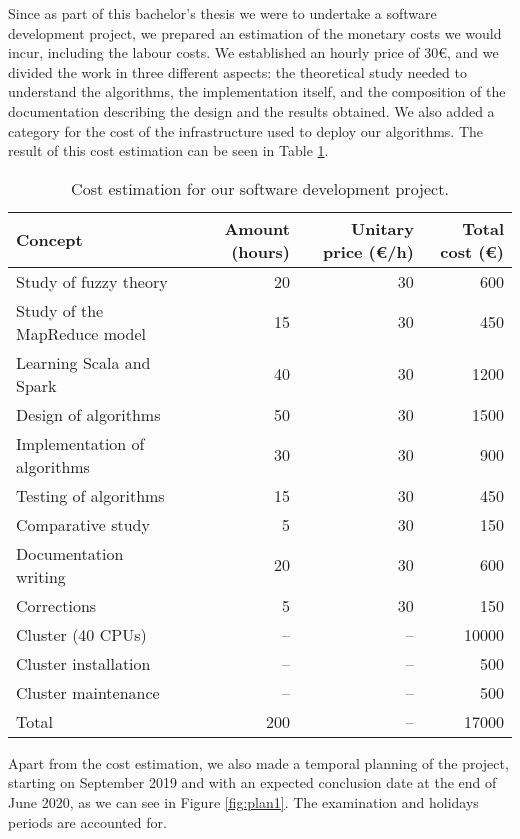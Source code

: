 %
%
%

Since as part of this bachelor's thesis we were to undertake a software development project, we prepared an estimation of the monetary costs we would incur, including the labour costs. We established an hourly price of 30€, and we divided the work in three different aspects: the theoretical study needed to understand the algorithms, the implementation itself, and the composition of the documentation describing the design and the results obtained. We also added a category for the cost of the infrastructure used to deploy our algorithms. The result of this cost estimation can be seen in Table \ref{tab:cost}.

\begin{table}[h!]
  \centering
\caption{Cost estimation for our software development project.}
\label{tab:cost}
\begin{tabular}{lrrr}
\toprule
Concept & Amount (hours) & Unitary price (€/h) & Total cost (€) \\ \midrule
Study of fuzzy theory & 20 & 30 & 600\\
Study of the MapReduce model & 15 & 30 & 450\\
Learning Scala and Spark & 40 & 30 & 1200\\
\midrule
Design of algorithms & 50 & 30 & 1500\\
Implementation of algorithms & 30 & 30 & 900\\
Testing of algorithms & 15 & 30 & 450\\
Comparative study & 5 & 30 & 150\\
\midrule
Documentation writing & 20 & 30 & 600\\
Corrections & 5 & 30 & 150\\ \midrule
Cluster (40 CPUs) & -- & -- & 10000\\
Cluster installation & -- & -- & 500\\
Cluster maintenance & -- & -- &500 \\ \midrule
Total & 200 & -- & 17000\\ \bottomrule
\end{tabular}
\end{table}

Apart from the cost estimation, we also made a temporal planning of the project, starting on September 2019 and with an expected conclusion date at the end of June 2020, as we can see in Figure \ref{fig:plan1}. The examination and holidays periods are accounted for.

